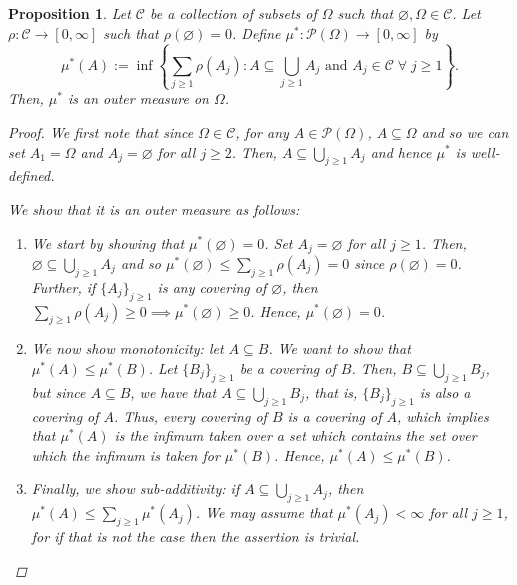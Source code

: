 \documentclass{article}
\newcommand{\Po}{\mathscr{P}}
\newcommand{\C}{\mathscr{C}}
\theoremstyle{spaced}
\newtheorem{proposition}[theorem]{Proposition}
\begin{document}
\begin{proposition}
    Let $\C$ be a collection of subsets of $\Omega$ such that $\varnothing, \Omega \in \C$. Let $\rho: \C \to [0, \infty]$ such that $\rho(\varnothing) = 0$. Define $\mu^*: \Po(\Omega) \to [0, \infty]$ by
    \begin{equation*}
    \mu^*(A) := \inf\left\{ \sum_{j\geq 1} \rho(A_j) : A \subseteq \bigcup_{j \geq 1} A_j \text{ and } A_j \in \C \; \forall \; j \geq 1 \right\}.
    \end{equation*}
    Then, $\mu^*$ is an outer measure on $\Omega$. 
\begin{proof}
    We first note that since $\Omega \in \C$, for any $A \in \Po(\Omega)$, $A \subseteq \Omega$ and so we can set $A_1 = \Omega$ and $A_j = \varnothing$ for all $j \geq 2$. Then, $A \subseteq \bigcup_{j \geq 1}A_j$ and hence $\mu^*$ is well-defined. 
    
    We show that it is an outer measure as follows:
    
    \begin{enumerate}
        
        \item We start by showing that $\mu^*(\varnothing) = 0$. Set $A_j = \varnothing$ for all $j \geq 1$. Then, $\varnothing \subseteq \bigcup_{j \geq 1} A_j$ and so $\mu^*(\varnothing) \leq \sum_{j \geq 1} \rho(A_j) = 0$ since $\rho(\varnothing) = 0$. Further, if $\{A_j\}_{j \geq 1}$ is any covering of $\varnothing$, then $\sum_{j \geq 1} \rho(A_j) \geq 0 \implies \mu^*(\varnothing) \geq 0$. Hence, $\mu^*(\varnothing) = 0$. 
        
        \item We now show monotonicity: let $A \subseteq B$. We want to show that $\mu^*(A) \leq \mu^*(B)$. Let $\{ B_j\}_{j \geq1} $ be a covering of $B$. Then, $B \subseteq \bigcup_{j \geq 1} B_j$, but since $A \subseteq B$, we have that $A \subseteq \bigcup_{j \geq 1} B_j$, that is, $\{ B_j \}_{j \geq 1}$ is also a covering of $A$. Thus, every covering of $B$ is a covering of $A$, which implies that $\mu^*(A)$ is the infimum taken over a set which contains the set over which the infimum is taken for $\mu^*(B)$. Hence, $\mu^*(A) \leq \mu^*(B)$.
        
        \item Finally, we show sub-additivity: if $A \subseteq \bigcup_{j \geq 1} A_j$, then $\mu^*(A) \leq \sum_{j \geq 1} \mu^*(A_j)$. We may assume that $\mu^*(A_j) < \infty$ for all $j \geq 1$, for if that is not the case then the assertion is trivial. 
        

\end{enumerate}
\end{proof}
\end{proposition}
\end{document}
